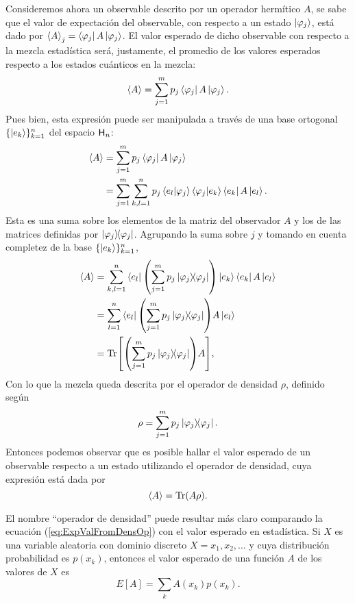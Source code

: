 Consideremos ahora un observable descrito por un operador hermítico $A$, se sabe que el valor de expectación del observable, con respecto a un estado $\ket{\varphi_{j}}$, está dado por $\expval{A}_{j}=\bra{\varphi_{j}}A\ket{\varphi_{j}}$. El valor esperado de dicho observable con respecto a la mezcla estadística será, justamente, el promedio de los valores esperados respecto a los estados cuánticos en la mezcla:
\begin{equation}
\expval{A}=\sum_{j=1}^{m}p_{j}\bra{\varphi_{j}}A\ket{\varphi_{j}}. \nonumber
\end{equation}
Pues bien, esta expresión puede ser manipulada a través de una base ortogonal $\{\ket{e_{k}}\}_{k=1}^{n}$ del espacio ${\sf H}_{n}$:
\begin{align}
\expval{A}&=\sum_{j=1}^{m}p_{j}\bra{\varphi_{j}}A\ket{\varphi_{j}}\nonumber\\ 
&=\sum_{j=1}^{m}\sum_{k,l=1}^{n}p_{j}\bra{e_{l}}\ket{\varphi_{j}}\bra{\varphi_{j}}\ket{e_{k}} \bra{e_{k}}A\ket{e_{l}}. \nonumber
\end{align}
Esta es una suma sobre los elementos de la matriz del observador $A$ y los de las matrices definidas por $\dyad{\varphi_{j}}$. Agrupando la suma sobre $j$ y tomando en cuenta completez de la base $\{\ket{e_{k}}\}_{k=1}^{n}$,
\begin{align}
\expval{A}&=\sum_{k,l=1}^{n}\bra{e_{l}}\qty(\sum_{j=1}^{m}p_{j}\dyad{\varphi_{j}})\ket{e_{k}} \bra{e_{k}}A\ket{e_{l}}\nonumber\\
&=\sum_{l=1}^{n}\bra{e_{l}}\qty(\sum_{j=1}^{m}p_{j}\dyad{\varphi_{j}})A\ket{e_{l}}\nonumber\\
&=\Tr[\qty(\sum_{j=1}^{m}p_{j}\dyad{\varphi_{j}})A]\rlap{,}\nonumber
\end{align}
Con lo que la mezcla queda descrita por el operador de densidad $\rho$, definido según
\begin{equation}\label{eq:DensOpMix}
\rho=\sum_{j=1}^{m}p_{j}\dyad{\varphi_{j}}.
\end{equation}
Entonces podemos observar que es posible hallar el valor esperado de un observable respecto a un estado  utilizando el operador de densidad, cuya expresión está dada por
\begin{equation}\label{eq:ExpValFromDensOp}
\expval{A}=\Tr(A\rho).
\end{equation}


\iffalse
El nombre ``operador de densidad'' puede resultar más claro comparando la ecuación (\ref{eq:ExpValFromDensOp}) con el valor esperado en estadística. Si $X$ es una variable aleatoria con dominio discreto $X=x_1,x_2,\dots$ y cuya distribución probabilidad es $p(x_k)$, entonces el valor esperado de una función $A$ de los valores de $X$ es
\begin{equation}
E[A]=\sum_{k} A(x_k) p(x_k).\nonumber
\end{equation}

